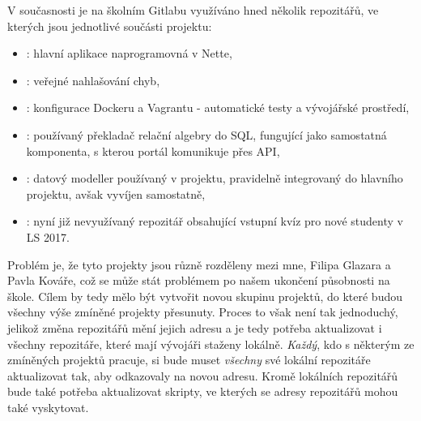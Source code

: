 V současnosti je na školním Gitlabu využíváno hned několik repozitářů, ve kterých jsou jednotlivé součásti projektu:
\begin{itemize}
 	\item {}: hlavní aplikace naprogramovná v Nette,
 	\item {}: veřejné nahlašování chyb,
 	\item {}: konfigurace Dockeru a Vagrantu - automatické testy a vývojářské prostředí,
 	\item {}: používaný překladač relační algebry do SQL, fungující jako samostatná komponenta, s kterou portál komunikuje přes API,
 	\item {}: datový modeller používaný v projektu, pravidelně integrovaný do hlavního projektu, avšak vyvíjen samostatně,
 	\item {}: nyní již nevyužívaný repozitář obsahující vstupní kvíz pro nové studenty v LS 2017.
\end{itemize}
Problém je, že tyto projekty jsou různě rozděleny mezi mne, Filipa Glazara a Pavla Kováře, což se může stát problémem po našem ukončení působnosti na škole. Cílem by tedy mělo být vytvořit novou skupinu projektů, do které budou všechny výše zmíněné projekty přesunuty. Proces to však není tak jednoduchý, jelikož změna  repozitářů mění jejich adresu a je tedy potřeba aktualizovat i všechny repozitáře, které mají vývojáři staženy lokálně. \emph{Každý}, kdo s některým ze zmíněných projektů pracuje, si bude muset \emph{všechny} své lokální repozitáře aktualizovat tak, aby odkazovaly na novou adresu. Kromě lokálních repozitářů bude také potřeba aktualizovat skripty, ve kterých se adresy repozitářů mohou také vyskytovat.
